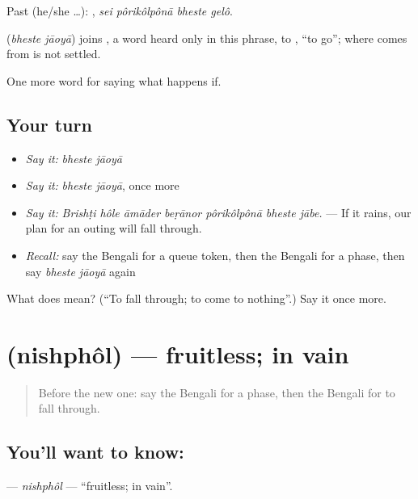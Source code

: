 Past (he/she …):    , \emph{sei pôrikôlpônā bheste gelô}.

\begin{cousinweb}
\textbf{ } (\emph{bheste jāoyā}) joins , a word heard only in this phrase, to , \textquotedblleft{}to go\textquotedblright{}; where  comes from is not settled.
\end{cousinweb}

\begin{grammarlens}[title={What you've built}]
One more word for saying what happens if.
\end{grammarlens}

\subsection*{Your turn}
\begin{itemize}
\raggedright
  \item \emph{Say it:} \emph{bheste jāoyā}
  \item \emph{Say it:} \emph{bheste jāoyā}, once more
  \item \emph{Say it:} \emph{Brishṭi hôle āmāder beṛānor pôrikôlpônā bheste jābe.} — If it rains, our plan for an outing will fall through.
  \item \emph{Recall:} say the Bengali for a queue token, then the Bengali for a phase, then say \emph{bheste jāoyā} again
\end{itemize}

\begin{tcolorbox}[breakable,colback=teal!4,colframe=teal!35!black,title={Before you move on}]
What does   mean? (\textquotedblleft{}To fall through; to come to nothing\textquotedblright{}.) Say it once more.
\end{tcolorbox}
\section[\texorpdfstring{\bn{নিষ্ফল} (nishphôl)}{নিষ্ফল (nishphôl)}]{ (nishphôl) — fruitless; in vain}

\label{lesson:BN-C542-nishphol}



\begin{quote}
Before the new one: say the Bengali for a phase, then the Bengali for to fall through.
\end{quote}

\subsection*{You'll want to know: }
\textbf{} — \emph{nishphôl} — \textquotedblleft{}fruitless; in vain\textquotedblright{}.

